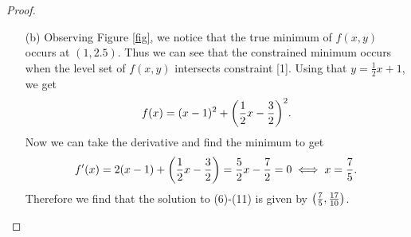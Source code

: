 \documentclass[12pt]{report}
\begin{document}
\begin{problem}
\begin{proof}
\begin{enumerate}
    \item [(b)]
    Observing Figure \ref{fig}, we notice that the true minimum of $f(x,y)$ occurs at $(1,2.5)$. Thus we can see that the constrained minimum occurs when the level set of $f(x,y)$ intersects constraint [1]. Using that $y = \frac{1}{2}x + 1$, we get
    \begin{equation*}
        f(x) = (x-1)^2 + {\left(\frac{1}{2}x - \frac{3}{2}\right)}^2.
    \end{equation*}
    Now we can take the derivative and find the minimum to get
    \begin{equation*}
        f'(x) = 2(x-1) + {\left(\frac{1}{2}x - \frac{3}{2}\right)} = \frac{5}{2}x - \frac{7}{2} = 0 \iff x = \frac{7}{5}.
    \end{equation*}
    Therefore we find that the solution to (6)-(11) is given by ${\left(\frac{7}{5},\frac{17}{10}\right)}$.
    

\end{enumerate}
\end{proof}
\end{problem}
\end{document}
